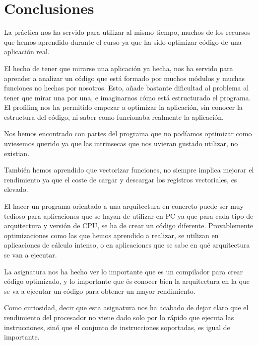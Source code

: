 \section{Conclusiones}

La pr\'{a}ctica nos ha servido para utilizar al mismo tiempo, muchos de los
recursos que hemos aprendido durante el curso ya que ha sido optimizar c\'{o}digo
de una aplicaci\'{o}n real. 

El hecho de tener que mirarse una aplicaci\'{o}n ya hecha, nos ha servido para
aprender a analizar un c\'{o}digo que est\'{a} formado por muchos m\'{o}dulos y muchas funciones
no hechas por nosotros. Esto, a\~{n}ade bastante dificultad al problema al tener que mirar
una por una, e imaginarnos c\'{o}mo est\'{a} estructurado el programa. El profiling
nos ha permitido empezar a optimizar la aplicaci\'{o}n, sin conocer la
estructura del c\'{o}digo, ni saber como funcionaba realmente la aplicaci\'{o}n.

Nos hemos encontrado con partes del programa que no pod\'{i}amos optimizar como
uviesemos querido ya que las intrinsecas que nos uvieran gustado utilizar,
no existian.

Tambi\'{e}n hemos aprendido que vectorizar funciones, no siempre implica
mejorar el rendimiento ya que el coste de cargar y descargar los registros
vectoriales, es elevado.

El hacer un programa orientado a una arquitectura en concreto
puede ser muy tedioso para aplicaciones que se hayan de utilizar en PC ya
que para cada tipo de arquitectura y versi\'{o}n de CPU, se ha de crear un
c\'{o}digo diferente. 
Provablemente optimizaciones como las que hemos aprendido a realizar, se
utilizan en aplicaciones de c\'{a}lculo intenso, o en aplicaciones que se sabe
en qu\'{e} arquitectura se van a ejecutar.

La asignatura nos ha hecho ver lo importante que es un compilador para crear
c\'{o}digo optimizado, y lo importante que \'{e}s conocer bien la arquitectura en
la que se va a ejecutar un c\'{o}digo para obtener un mayor rendimiento. 

Como curiosidad, decir que esta asignatura nos ha acabado de dejar claro
que el rendimiento del procesador no viene dado solo por lo r\'{a}pido que
ejecuta las instrucciones, sin\'{o} que el conjunto de instrucciones
soportadas, es igual de importante.

